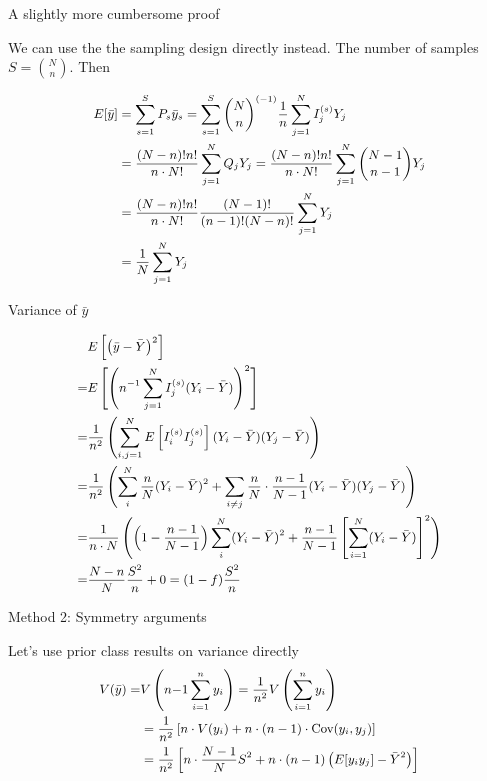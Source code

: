 \documentclass[
  ignorenonframetext,
]{beamer}
\begin{document}
\begin{frame}{A slightly more cumbersome proof}
\protect\hypertarget{a-slightly-more-cumbersome-proof}{}

We can use the the sampling design directly instead. The number of
samples \(S = {N \choose n}\). Then

\[\small
\begin{aligned}
E[ \bar y ] &= \sum_{s=1}^S P_s \bar y_s = \sum_{s=1}^S {N \choose n}^{(-1)} \frac{1}{n} \sum_{j=1}^N I^{(s)}_j Y_j \\
 &= \frac{(N-n)!n!}{n \cdot N!} \sum_{j=1}^N Q_j Y_j = \frac{(N-n)!n!}{n \cdot N!} \sum_{j=1}^N {N-1 \choose n-1} Y_j \\
 &= \frac{(N-n)!n!}{n \cdot N!} \frac{(N-1)!}{(n-1)! (N-n)!} \sum_{j=1}^N Y_j \\
 &= \frac{1}{N} \sum_{j=1}^N Y_j \\
\end{aligned}
\]

\end{frame}

\begin{frame}{Variance of \(\bar y\)}
\protect\hypertarget{variance-of-bar-y}{}

\[ \small
\begin{aligned}
&E \left[ \left( \bar y - \bar Y \right)^2  \right] \\
= &E \left[ \left( n^{-1} \sum_{j=1}^N I_j^{(s)} (Y_i - \bar Y) \right)^2  \right] \\
= &\frac{1}{n^2} \left(  \sum_{i,j=1}^N E \left[I_i^{(s)} I_j^{(s)} \right] (Y_i - \bar Y) (Y_j - \bar Y)  \right) \\
= &\frac{1}{n^2}  \left( \sum_{i}^N \frac{n}{N} (Y_i - \bar Y)^2  + 
\sum_{i \neq j} \frac{n}{N} \cdot \frac{n-1}{N-1} (Y_i - \bar Y) (Y_j - \bar Y)  \right) \\
= &\frac{1}{n \cdot N}  \left( \left(1 - \frac{n-1}{N-1} \right) \sum_{i}^N (Y_i - \bar Y)^2  + 
\frac{n-1}{N-1}\left[ \sum_{i=1}^N  (Y_i - \bar Y) \right]^2  \right) \\
= &\frac{N-n}{N} \frac{S^2}{n} + 0 = (1-f)\frac{S^2}{n}
\end{aligned}
\]

\end{frame}

\begin{frame}{Method 2: Symmetry arguments}
\protect\hypertarget{method-2-symmetry-arguments}{}

Let's use prior class results on variance directly \[ \small
\begin{aligned}
V(\bar y) = &V \left( n{-1} \sum_{i=1}^n y_i \right) = \frac{1}{n^2} V \left( \sum_{i=1}^n y_i \right) \\
&= \frac{1}{n^2} \left[ n \cdot V(y_i) + n \cdot (n-1) \cdot \text{Cov} (y_i, y_j) \right] \\ 
&= \frac{1}{n^2} \left[ n \cdot \frac{N-1}{N} S^2 + n \cdot (n-1) \left( E[y_i y_j] - \bar Y^2 \right) \right] 
\end{aligned}
\]

\end{frame}
\end{document}
